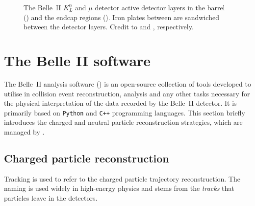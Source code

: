 \begin{figure}[htbp!]
    \caption{\label{fig:klm}
        The Belle~II $K_L^0$ and $\mu$ detector active detector layers in the barrel () and the endcap regions ().
        Iron plates between are sandwiched between the detector layers.
        Credit to \cite{Krohn:317929} and \cite{Aushev:2014spa}, respectively.
    }
\end{figure}

\section{The Belle II software}\label{sec:belle2_software}

The Belle~II analysis software (\basftwo) \cite{Kuhr:2018lps} is an open-source collection of tools developed to utilise in collision event reconstruction, analysis 
and any other tasks necessary for the physical interpretation of the data recorded by the Belle~II detector.
It is primarily based on \texttt{Python} and \texttt{C++} programming languages.
This section briefly introduces the charged and neutral particle reconstruction strategies, which are managed by \basftwo.

\subsection{Charged particle reconstruction}\label{sec:tracking}

Tracking is used to refer to the charged particle trajectory reconstruction.
The naming is used widely in high-energy physics and stems from the \textit{tracks} that particles leave in the detectors.

